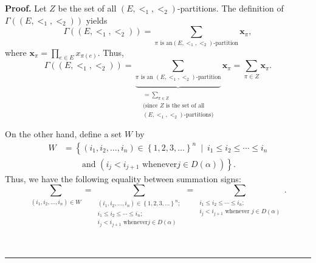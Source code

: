 \documentclass[numbers=enddot,12pt,final,onecolumn,notitlepage,abstracton]{scrartcl}
\theoremstyle{definition}
\newenvironment{proof}[1][Proof]{\noindent\textbf{#1.} }{\ \rule{0.5em}{0.5em}}
\let\sumnonlimits\sum
\let\prodnonlimits\prod
\renewcommand{\sum}{\sumnonlimits\limits}
\renewcommand{\prod}{\prodnonlimits\limits}
\newenvironment{verlong}{}{}
\begin{document}
\begin{verlong}
\begin{footnotesize}
\begin{proof}
Let $Z$ be the set of all $\left(  E,<_{1},<_{2}\right)  $-partitions. The
definition of $\Gamma\left(  \left(  E,<_{1},<_{2}\right)  \right)  $ yields%
\[
\Gamma\left(  \left(  E,<_{1},<_{2}\right)  \right)  =\sum_{\pi\text{ is an
}\left(  E,<_{1},<_{2}\right)  \text{-partition}}{\mathbf{x}}_{\pi},
\]
where ${\mathbf{x}}_{\pi}=\prod_{e\in E}x_{\pi\left(  e\right)  }$. Thus,%
\begin{equation}
\Gamma\left(  \left(  E,<_{1},<_{2}\right)  \right)  =\underbrace{\sum
_{\pi\text{ is an }\left(  E,<_{1},<_{2}\right)  \text{-partition}}%
}_{\substack{=\sum_{\pi\in Z}\\\text{(since }Z\text{ is the set of
all}\\\left(  E,<_{1},<_{2}\right)  \text{-partitions)}}}{\mathbf{x}}_{\pi
}=\sum_{\pi\in Z}\mathbf{x}_{\pi}. \label{pf.prop.example.Gamma.c3.Gamma=}%
\end{equation}


On the other hand, define a set $W$ by%
\begin{align}
W  &  =\left\{  \left(  i_{1},i_{2},\ldots,i_{n}\right)  \in\left\{
1,2,3,\ldots\right\}  ^{n}\ \mid\ i_{1}\leq i_{2}\leq\cdots\leq i_{n}\right.
\nonumber\\
&  \ \ \ \ \ \ \ \ \ \ \left.  \text{and }\left(  i_{j}<i_{j+1}\text{ whenever
}j\in D\left(  \alpha\right)  \right)  \right\}  .
\label{pf.prop.example.Gamma.c3.W=}%
\end{align}
Thus, we have the following equality between summation signs:%
\[
\sum_{\left(  i_{1},i_{2},\ldots,i_{n}\right)  \in W}=\sum_{\substack{\left(
i_{1},i_{2},\ldots,i_{n}\right)  \in\left\{  1,2,3,\ldots\right\}
^{n};\\i_{1}\leq i_{2}\leq\cdots\leq i_{n};\\i_{j}<i_{j+1}\text{ whenever
}j\in D\left(  \alpha\right)  }}=\sum_{\substack{i_{1}\leq i_{2}\leq\cdots\leq
i_{n};\\i_{j}<i_{j+1}\text{ whenever }j\in D\left(  \alpha\right)  }}.
\]



\end{proof}
\end{footnotesize}
\end{verlong}
\end{document}
